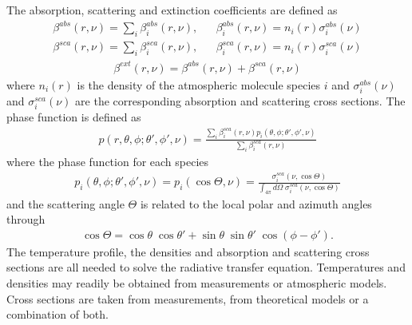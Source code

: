 The absorption, scattering and extinction coefficients are defined as
\citep{Stamnes1986b}
\begin{eqnarray}
\beta^{abs}(r, \nu)=\sum_{i}\beta^{abs}_{i}(r, \nu), &&
\beta^{abs}_{i}(r, \nu)=n_{i}(r) \sigma_{i}^{abs}(\nu)
\label{eq:abs}
\\
\beta^{sca}(r, \nu)=\sum_{i}\beta^{sca}_{i}(r, \nu), &&
\beta^{sca}_{i}(r, \nu)=n_{i}(r) \sigma_{i}^{sca}(\nu)
\label{eq:sca}
\end{eqnarray}
\begin{eqnarray}
\beta^{ext}(r, \nu)=\beta^{abs}(r, \nu)+\beta^{sca}(r, \nu)
\nonumber
\end{eqnarray}
where $n_{i}(r)$ is the density of the atmospheric molecule species $i$ and 
$\sigma_{i}^{abs}(\nu)$ and $\sigma_{i}^{sca}(\nu)$  are the
corresponding absorption and scattering cross sections. The phase function
is defined as
\begin{eqnarray}
p(r, \theta, \phi; \theta ', \phi ', \nu)=
\frac{\sum_{i}\beta_{i}^{sca}(r, \nu)
p_{i}(\theta, \phi; \theta ', \phi ', \nu)}
{\sum_{i}\beta_{i}^{sca}(r, \nu)}
\nonumber
\end{eqnarray}
where the phase function for each species 
\begin{eqnarray}
p_{i}(\theta, \phi; \theta ', \phi ', \nu)=
p_{i}(\cos\Theta, \nu)=
\frac{\sigma_{i}^{sca}(\nu, \cos\Theta)}
{\int_{4\pi}d\Omega\;\sigma_{i}^{sca}(\nu, \cos\Theta)}
\nonumber
\end{eqnarray}
and the scattering angle $\Theta$ is related to the local polar and 
azimuth angles through
\begin{eqnarray}
\cos\Theta = \cos\theta\;\cos\theta ' + \sin\theta\;\sin\theta '\;
\cos(\phi-\phi ').
\nonumber
\end{eqnarray}
The temperature profile, the densities and absorption and scattering 
cross sections are all needed to solve the radiative transfer equation.
Temperatures and densities may readily be obtained from measurements
or atmospheric models. Cross sections are taken from
measurements, from theoretical models or a combination of both.

